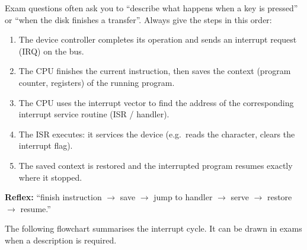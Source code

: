 \documentclass[11pt]{article}
\newcommand{\cle}[1]{{\popxbold\color{popdark}#1}}
\begin{document}
\begin{methode}
Exam questions often ask you to ``describe what happens when a key is pressed'' or ``when the disk finishes a transfer''. Always give the steps in this order:
\begin{enumerate}
\item The device controller completes its operation and sends an \cle{interrupt request} (IRQ) on the bus.
\item The CPU finishes the current instruction, then saves the \cle{context} (program counter, registers) of the running program.
\item The CPU uses the \cle{interrupt vector} to find the address of the corresponding \cle{interrupt service routine} (ISR / handler).
\item The ISR executes: it services the device (e.g.\ reads the character, clears the interrupt flag).
\item The saved context is restored and the interrupted program resumes exactly where it stopped.
\end{enumerate}
\textbf{Reflex:} ``finish instruction $\rightarrow$ save $\rightarrow$ jump to handler $\rightarrow$ serve $\rightarrow$ restore $\rightarrow$ resume.''
\end{methode}

\begin{experience}
The following flowchart summarises the interrupt cycle. It can be drawn in exams when a description is required.
\begin{center}
\end{center}
\end{experience}
\end{document}
